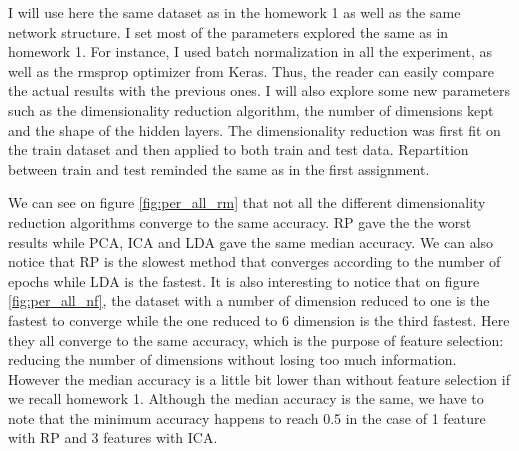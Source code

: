 \documentclass[twocolumn, 10pt]{article}
\begin{document}
			I will use here the same dataset as in the homework 1 as well as the same network structure. I set most of the parameters explored the same as in homework 1.  For instance, I used batch normalization in all the experiment, as well as the rmsprop optimizer from Keras. Thus, the reader can easily compare the actual results with the previous ones. I will also explore some new parameters such as the dimensionality reduction algorithm, the number of dimensions kept and the shape of the hidden layers. The dimensionality reduction was first fit on the train dataset and then applied to both train and test data. Repartition between train and test reminded the same as in the first assignment.

			We can see on figure \ref{fig:per_all_rm} that not all the different dimensionality reduction algorithms converge to the same accuracy. RP gave the the worst results while PCA, ICA and LDA gave the same median accuracy. We can also notice that RP is the slowest method that converges according to the number of epochs while LDA is the fastest. It is also interesting to notice that on figure \ref{fig:per_all_nf}, the dataset with a number of dimension reduced to one is the fastest to converge while the one reduced to 6 dimension is the third fastest. Here they all converge to the same accuracy, which is the purpose of feature selection: reducing the number of dimensions without losing too much information. However the median accuracy is a little bit lower than without feature selection if we recall homework 1. Although the median accuracy is the same, we have to note that the minimum accuracy happens to reach 0.5 in the case of 1 feature with RP and 3 features with ICA.
\end{document}
